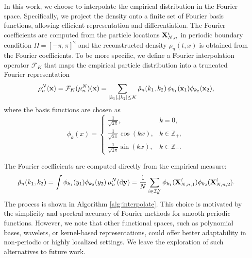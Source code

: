 \documentclass[preprint,12pt]{elsarticle}
\theoremstyle{definition}
\theoremstyle{remark}
\begin{document}
In this work, we choose to interpolate the empirical distribution in the Fourier space. Specifically, we project the density onto a finite set of Fourier basis functions, allowing efficient representation and differentiation. The Fourier coefficients are computed from the particle locations $\mathbf{X}_{N,n}^i$ in periodic boundary condition $\Omega=[-\pi,\pi]^2$ and the reconstructed density 
$\rho_n(t,x)$ is obtained from the Fourier coefficients. To be more specific, we define a Fourier interpolation operator $\mathcal F_K$
that maps the empirical particle distribution into a truncated Fourier representation 
\[
\rho^N_n(\mathbf{x}) = \mathcal{F}_K(\mu^N_n)(\mathbf{x}) 
          = \sum_{\vert k_1\vert ,\vert k_2\vert \leq K} \hat{\rho}_n(k_1,k_2)\,\phi_{k_1}(\mathbf{x}_1)\phi_{k_2}(\mathbf{x}_2),
\]
where the basis functions are chosen as
\[
\phi_k(x) =
\begin{cases}
\frac{1}{\sqrt{2\pi}}, & k=0, \\
\frac{1}{\sqrt{2\pi}} \cos(k  x), & k \in \mathbb{Z}_+, \\
\frac{1}{\sqrt{2\pi}}\sin(k  x), & k \in \mathbb{Z}_- .
\end{cases}
\]

The Fourier coefficients are computed directly from the empirical measure:
\begin{equation}
\hat{\rho}_n(k_1,k_2) = \int \phi_{k_1}(y_1)\phi_{k_2}(y_2)\,\mu^N_n(\mathrm{d}\mathbf{y}) 
= \frac{1}{N}\sum_{i\in \mathcal I^N_n} \phi_{k_1}(\mathbf{X}_{N,    n,1}^{i})\phi_{k_2}(\mathbf{X}_{N,n,2}^{i}).
\label{eq:Fourier_mode}
\end{equation}
The process is shown in Algorithm \ref{alg:interpolate}. 
This choice is motivated by the simplicity and spectral accuracy of Fourier methods for smooth periodic functions. However, we note that other functional spaces, such as polynomial bases, wavelets, or kernel-based representations, could offer better adaptability in non-periodic or highly localized settings. We leave the exploration of such alternatives to future work.
\end{document}
